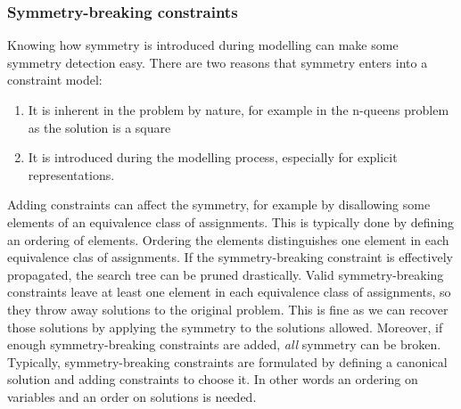 \documentclass[CS4402-Notes.tex]{subfiles}
\begin{document}
\subsubsection{Symmetry-breaking constraints}
Knowing how symmetry is introduced during modelling can make some symmetry detection easy. There are two reasons that symmetry enters into a constraint model:
\begin{enumerate}
\item It is inherent in the problem by nature, for example in the n-queens problem as the solution is a square
\item It is introduced during the modelling process, especially for explicit representations.
\end{enumerate}
Adding constraints can affect the symmetry, for example by disallowing some elements of an equivalence class of assignments. This is typically done by defining an ordering of elements. Ordering the elements distinguishes one element in each equivalence clas of assignments. If the symmetry-breaking constraint is effectively propagated, the search tree can be pruned drastically. Valid symmetry-breaking constraints leave at least one element in each equivalence class of assignments, so they throw away solutions to the original problem. This is fine as we can recover those solutions by applying the symmetry to the solutions allowed. Moreover, if enough symmetry-breaking constraints are added, \textit{all} symmetry can be broken.
\n
Typically, symmetry-breaking constraints are formulated by defining a canonical solution and adding constraints to choose it. In other words an ordering on variables and an order on solutions is needed.
\end{document}
